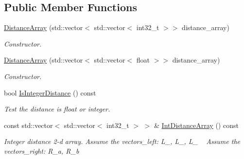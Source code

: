 \subsection*{Public Member Functions}
\begin{DoxyCompactItemize}
\item 
\mbox{\label{classmilvus_1_1_distance_array_af17665670feba52e82903c24aed09151}} 
\hyperlink{classmilvus_1_1_distance_array_af17665670feba52e82903c24aed09151}{Distance\+Array} (std\+::vector$<$ std\+::vector$<$ int32\+\_\+t $>$$>$ distance\+\_\+array)
\begin{DoxyCompactList}\small\item\em Constructor. \end{DoxyCompactList}\item 
\mbox{\label{classmilvus_1_1_distance_array_a77ce89ebc2e4da79678cede25ec1a3cf}} 
\hyperlink{classmilvus_1_1_distance_array_a77ce89ebc2e4da79678cede25ec1a3cf}{Distance\+Array} (std\+::vector$<$ std\+::vector$<$ float $>$$>$ distance\+\_\+array)
\begin{DoxyCompactList}\small\item\em Constructor. \end{DoxyCompactList}\item 
\mbox{\label{classmilvus_1_1_distance_array_ac6d31fd8e0baddc05b87f61af2e3dc2d}} 
bool \hyperlink{classmilvus_1_1_distance_array_ac6d31fd8e0baddc05b87f61af2e3dc2d}{Is\+Integer\+Distance} () const
\begin{DoxyCompactList}\small\item\em Test the distance is float or integer. \end{DoxyCompactList}\item 
\mbox{\label{classmilvus_1_1_distance_array_a0f6a878eed8019fab14d78970bbf4dc0}} 
const std\+::vector$<$ std\+::vector$<$ int32\+\_\+t $>$ $>$ \& \hyperlink{classmilvus_1_1_distance_array_a0f6a878eed8019fab14d78970bbf4dc0}{Int\+Distance\+Array} () const
\begin{DoxyCompactList}\small\item\em Integer distance 2-\/d array. Assume the vectors\+\_\+left\+: L\+\_, L\+\_, L\+\_ ~\newline
 Assume the vectors\+\_\+right\+: R\+\_\+a, R\+\_\+b ~\newline

\end{DoxyCompactList}
\end{DoxyCompactItemize}
